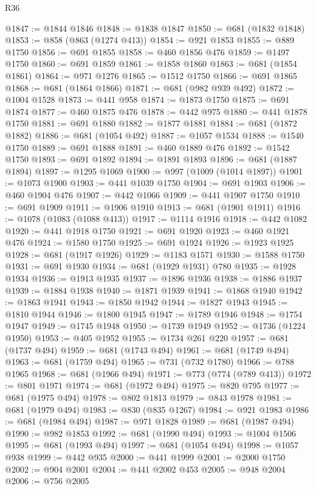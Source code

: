 \begin{lexlean}{R36}
\begin{coremodule}
{{{{{{{{{{{{{{{{{{{{{{{{{{{{{{{{{{{{{{{{{{{{{{{{{{{{{{{{{{{{{{{{{{{{{{{{{{{{{{{{{{@1847 := @1844 @1846
@1848 := @1838 @1847
@1850 := @681 (@1832 @1848)
@1853 := @858 (@863 (@1274 @413))
@1854 := @921 @1853
@1855 := @889 @1750
@1856 := @691 @1855
@1858 := @460 @1856 @476
@1859 := @1497 @1750
@1860 := @691 @1859
@1861 := @1858 @1860
@1863 := @681 (@1854 @1861)
@1864 := @971 @1276
@1865 := @1512 @1750
@1866 := @691 @1865
@1868 := @681 (@1864 @1866)
@1871 := @681 (@982 @939 @492)
@1872 := @1004 @1528
@1873 := @441 @958
@1874 := @1873 @1750
@1875 := @691 @1874
@1877 := @460 @1875 @476
@1878 := @442 @975
@1880 := @441 @1878 @1750
@1881 := @691 @1880
@1882 := @1877 @1881
@1884 := @681 (@1872 @1882)
@1886 := @681 (@1054 @492)
@1887 := @1057 @1534
@1888 := @1540 @1750
@1889 := @691 @1888
@1891 := @460 @1889 @476
@1892 := @1542 @1750
@1893 := @691 @1892
@1894 := @1891 @1893
@1896 := @681 (@1887 @1894)
@1897 := @1295 @1069
@1900 := @997 (@1009 (@1014 @1897))
@1901 := @1073 @1900
@1903 := @441 @1039 @1750
@1904 := @691 @1903
@1906 := @460 @1904 @476
@1907 := @442 @1066
@1909 := @441 @1907 @1750
@1910 := @691 @1909
@1911 := @1906 @1910
@1913 := @681 (@1901 @1911)
@1916 := @1078 (@1083 (@1088 @413))
@1917 := @1114 @1916
@1918 := @442 @1082
@1920 := @441 @1918 @1750
@1921 := @691 @1920
@1923 := @460 @1921 @476
@1924 := @1580 @1750
@1925 := @691 @1924
@1926 := @1923 @1925
@1928 := @681 (@1917 @1926)
@1929 := @1183 @1571
@1930 := @1588 @1750
@1931 := @691 @1930
@1934 := @681 (@1929 @1931) @780
@1935 := @1928 @1934
@1936 := @1913 @1935
@1937 := @1896 @1936
@1938 := @1886 @1937
@1939 := @1884 @1938
@1940 := @1871 @1939
@1941 := @1868 @1940
@1942 := @1863 @1941
@1943 := @1850 @1942
@1944 := @1827 @1943
@1945 := @1810 @1944
@1946 := @1800 @1945
@1947 := @1789 @1946
@1948 := @1754 @1947
@1949 := @1745 @1948
@1950 := @1739 @1949
@1952 := @1736 (@1224 @1950)
@1953 := @405 @1952
@1955 := @1734 @261 @220
@1957 := @681 (@1737 @494)
@1959 := @681 (@1743 @494)
@1961 := @681 (@1749 @494)
@1963 := @681 (@1759 @494)
@1965 := @731 (@732 @1780)
@1966 := @788 @1965
@1968 := @681 (@1966 @494)
@1971 := @773 (@774 (@789 @413))
@1972 := @801 @1971
@1974 := @681 (@1972 @494)
@1975 := @820 @795
@1977 := @681 (@1975 @494)
@1978 := @802 @1813
@1979 := @843 @1978
@1981 := @681 (@1979 @494)
@1983 := @830 (@835 @1267)
@1984 := @921 @1983
@1986 := @681 (@1984 @494)
@1987 := @971 @1828
@1989 := @681 (@1987 @494)
@1990 := @982 @1853
@1992 := @681 (@1990 @494)
@1993 := @1004 @1506
@1995 := @681 (@1993 @494)
@1997 := @681 (@1054 @494)
@1998 := @1057 @938
@1999 := @442 @935
@2000 := @441 @1999
@2001 := @2000 @1750
@2002 := @904 @2001
@2004 := @441 @2002 @453
@2005 := @948 @2004
@2006 := @756 @2005
}}}}}}}}}}}}}}}}}}}}}}}}}}}}}}}}}}}}}}}}}}}}}}}}}}}}}}}}}}}}}}}}}}}}}}}}}}}}}}}}}}
\end{coremodule}
\end{lexlean}
